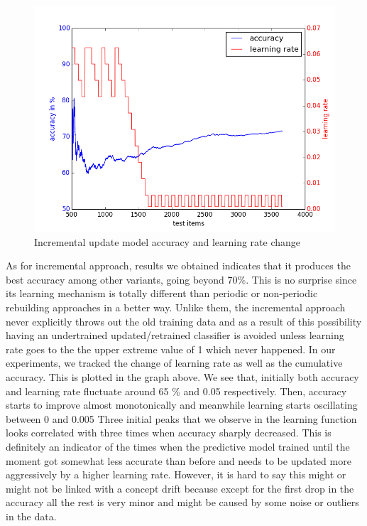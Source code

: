 \documentclass{article} %
\begin{document}
 \begin{figure}[htbp]
  \centering
  \includegraphics[scale=0.5]{./plots/incremental_plot.png}
  \caption{Incremental update model accuracy and learning rate change}
\end{figure}


As for incremental approach, results we obtained indicates that it produces the best accuracy among other variants, going beyond 70\%. This is no surprise since its learning mechanism is totally different than periodic or non-periodic rebuilding approaches in a better way. Unlike them, the incremental approach never explicitly throws out the old training data and as a result of this possibility having an undertrained updated/retrained classifier is avoided unless learning rate goes to the the upper extreme value of 1 which never happened. In our experiments, we tracked the change of learning rate as well as the cumulative accuracy. This is plotted in the graph above. We see that, initially both accuracy and learning rate fluctuate around 65 \% and 0.05 respectively. Then, accuracy starts to improve almost monotonically and meanwhile learning starts oscillating between 0 and 0.005   Three initial peaks that we observe in the learning function looks correlated with three times when accuracy sharply decreased. This is definitely an indicator of the times when the predictive model trained until the moment got somewhat less accurate than before and needs to be updated more aggressively by a higher learning rate. However, it is hard to say this might or might not be linked with a concept drift because except for the first drop in the accuracy all the rest is very minor and might be caused by some noise or outliers in the data.
\end{document}
